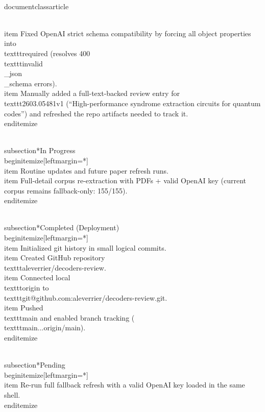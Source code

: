 \\documentclass{article}
\begin{document}
  \\item Fixed OpenAI strict schema compatibility by forcing all object properties into \\texttt{required} (resolves 400 \\texttt{invalid\\_json\\_schema} errors).
  \\item Manually added a full-text-backed review entry for \\texttt{2603.05481v1} (``High-performance syndrome extraction circuits for quantum codes'') and refreshed the repo artifacts needed to track it.
\\end{itemize}

\\subsection*{In Progress}
\\begin{itemize}[leftmargin=*]
  \\item Routine updates and future paper refresh runs.
  \\item Full-detail corpus re-extraction with PDFs + valid OpenAI key (current corpus remains fallback-only: 155/155).
\\end{itemize}

\\subsection*{Completed (Deployment)}
\\begin{itemize}[leftmargin=*]
  \\item Initialized git history in small logical commits.
  \\item Created GitHub repository \\texttt{aleverrier/decoders-review}.
  \\item Connected local \\texttt{origin} to \\texttt{git@github.com:aleverrier/decoders-review.git}.
  \\item Pushed \\texttt{main} and enabled branch tracking (\\texttt{main...origin/main}).
\\end{itemize}

\\subsection*{Pending}
\\begin{itemize}[leftmargin=*]
  \\item Re-run full fallback refresh with a valid OpenAI key loaded in the same shell.
\\end{itemize}

\
\end{document}
